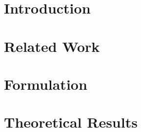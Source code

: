 \documentclass{article}
\title{}
\author{Anonymous Authors}
\begin{document}
\maketitle

\begin{abstract}
\end{abstract}

\section{Introduction}

\section{Related Work}

\section{Formulation}

\section{Theoretical Results}
\end{document}
